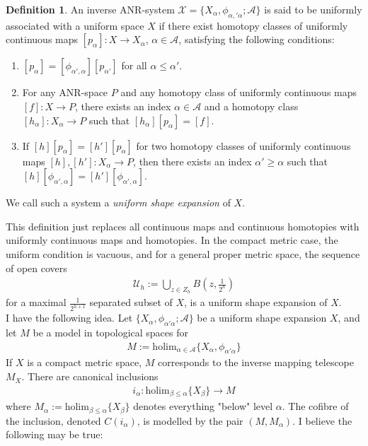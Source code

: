 \documentclass[a4paper,11pt]{article}
\theoremstyle{definition}
\newtheorem{definition}{Definition}[section]
\theoremstyle{plain}
\theoremstyle{remark}
\begin{document}
{\begin{definition} An inverse ANR-system $\mathcal{X} = \{X_{\alpha}, \phi_{\alpha,'\alpha}; \mathcal{A}\}$ is said to be uniformly associated with a uniform space $X$ if there exist homotopy classes of uniformly continuous maps $[p_{\alpha}]: X\rightarrow X_{\alpha}$, $\alpha\in \mathcal{A}$, satisfying the following conditions:
\begin{enumerate}
\item $[p_{\alpha}] = [\phi_{\alpha',\alpha}] [p_{\alpha'}]$ for all $\alpha \leq \alpha'$.
\item For any ANR-space $P$ and any homotopy class of uniformly continuous maps $[f]: X\rightarrow P$, there exists an index $\alpha\in \mathcal{A}$ and a homotopy class $[h_{\alpha}]: X_{\alpha}\rightarrow P$ such that $[h_{\alpha}] [p_{\alpha}] = [f]$. 
\item If $[h] [p_{\alpha}] = [h'] [p_{\alpha}]$ for two homotopy classes of uniformly continuous maps $[h],[h']: X_{\alpha}\rightarrow P$, then there exists an index $\alpha'\geq \alpha$ such that $[h][\phi_{\alpha',\alpha}] = [h'] [\phi_{\alpha',\alpha}]$. 
\end{enumerate} 
We call such a system a \textit{uniform shape expansion} of $X$. 
\end{definition}

This definition just replaces all continuous maps and continuous homotopies with uniformly continuous maps and homotopies. In the compact metric case, the uniform condition is vacuous, and for a general proper metric space, the sequence of open covers 
\begin{align*}
\mathcal{U}_{h} := \bigcup_{z\in Z_{h}} B(z,\frac{1}{2^h})
\end{align*} for a maximal $\frac{1}{2^{h+1}}$ separated subset of $X$, is a uniform shape expansion of $X$. \\
 
I have the following idea. Let $\{X_{\alpha},\phi_{\alpha'\alpha}; \mathcal{A}\}$ be a uniform shape expansion $X$, and let $M$ be a model in topological spaces for 
\begin{align*}
M:=\text{holim}_{\alpha\in \mathcal{A}} \{X_{\alpha}, \phi_{\alpha'\alpha}\}
\end{align*}
If $X$ is a compact metric space, $M$ corresponds to the inverse mapping telescope $M_{X}$. There are canonical inclusions 
\begin{align*}
i_{\alpha}: \text{holim}_{\beta \leq \alpha} \{X_{\beta}\} \rightarrow M
\end{align*}
where $M_{\alpha} := \text{holim}_{\beta \leq \alpha} \{X_{\beta}\}$ denotes everything "below" level $\alpha$. The cofibre of the inclusion, denoted $C(i_{\alpha})$, is modelled by the pair $(M,M_{\alpha})$. I believe the following may be true:
 
}
\end{document}
